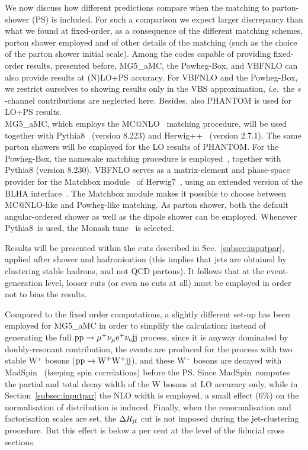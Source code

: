We now discuss how different predictions compare when the matching to parton-shower (PS) is included. For such
a comparison we expect larger discrepancy than what we found at fixed-order, as a consequence of the different
matching schemes, parton shower employed and of other details of the matching (such as the choice of the parton shower initial scale). Among
the codes capable of providing fixed-order results, presented before, {\sc MG5\_aMC}, the {\sc Powheg-Box}, and {\sc VBFNLO}
can also provide results at (N)LO+PS accuracy. For {\sc VBFNLO} and the {\sc Powheg-Box}, we
restrict ourselves to showing results only in the VBS approximation,
{\emph i.e.}\ the $s$-channel contributions are neglected here. Besides,
also {\sc PHANTOM} is used for LO+PS results.\\
{\sc MG5\_aMC}, which
employs the {\sc MC@NLO}~\cite{Frixione:2002ik} matching procedure, will be used together with {\sc Pythia8}~\cite{Sjostrand:2014zea} (version 8.223)
and {\sc Herwig++}~\cite{Bahr:2008pv, Bellm:2013hwb} (version 2.7.1). The same parton showers will be employed for the LO results of {\sc PHANTOM}. For the {\sc Powheg-Box}, the namesake
matching procedure is employed~\cite{Nason:2004rx,Frixione:2007vw}, together with {\sc Pythia8} (version 8.230). {\sc VBFNLO} serves as a matrix-element and phase-space provider
for the {\sc Matchbox} module~\cite{Platzer:2011bc} of {\sc
Herwig7}~\cite{Bellm:2015jjp,Bellm:2017bvx}, using an extended version of the BLHA
interface~\cite{Binoth:2010xt,Alioli:2013nda,Andersen:2014efa}. The {\sc Matchbox} module makes it
possible to choose between {\sc MC\-@NLO}-like and {\sc Powheg}-like
matching. As parton shower, both the default angular-ordered shower as
well as the dipole shower can be employed.
Whenever {\sc Pythia8}\ is used, the Monash tune~\cite{Skands:2014pea} is selected.

Results will be presented within the cuts described in Sec.~\ref{subsec:inputpar}, applied after shower and hadronisation (this implies that jets
are obtained by clustering stable hadrons, and not QCD partons). It follows that at the event-generation level, looser cuts (or even no cuts at all)
must be employed in order not to bias the results. 

Compared to the fixed order computations, a slightly different set-up has been employed for {\sc MG5\_aMC} in order to simplify the calculation: instead of generating the full
${\rm p}{\rm p}\to\mu^+\nu_\mu{\rm e}^+\nu_{\rm e}{\rm j}{\rm j}$ process, since it is anyway dominated by doubly-resonant contribution, the
events are produced for the process with two stable W$^+$ bosons (${\rm p}{\rm p}\to{\rm W^+}{\rm W^+}{\rm j}{\rm j}$), and these W$^+$ bosons
are decayed with {\sc MadSpin}~\cite{Artoisenet:2012st} (keeping spin correlations) before the PS. Since {\sc MadSpin}\ computes
the partial and total decay width of the W bosons at LO accuracy only, while in Section~\ref{subsec:inputpar} the NLO width is employed,
a small effect (6\%) on the normalisation of distribution is induced. Finally, when the renormalisation
and factorisation scales are set, the $\Delta R_{\text{j}\ell}$ cut is not imposed during the jet-clustering procedure.
But this effect is below a per cent at the level of the fiducial cross sections.

